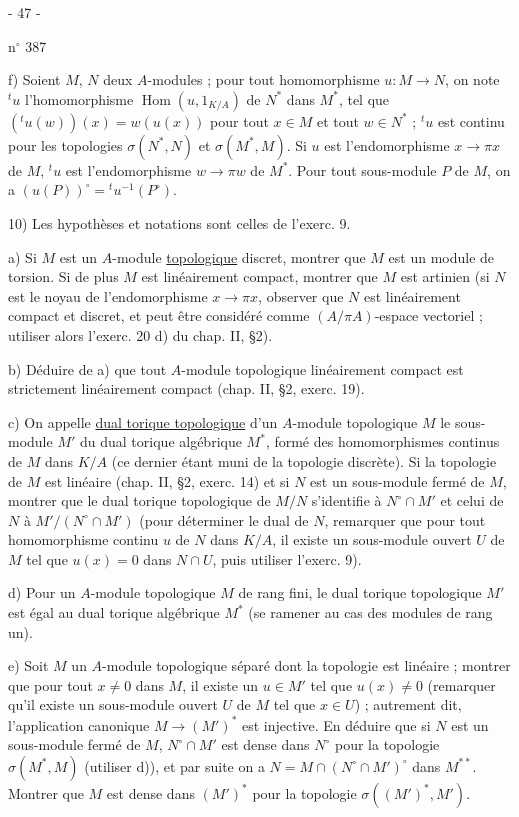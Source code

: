 \begin{center}- 47 -\end{center}
\hfill n$^\circ$ 387

f) Soient $M$, $N$ deux $A$-modules ; pour tout homomorphisme $u:M\longrightarrow N$, on note ${}^tu$ l'homomorphisme $\operatorname{Hom}(u,1_{K/A})$ de $N^*$ dans $M^*$, tel que $({}^tu(w))(x)=w(u(x))$ pour tout $x\in M$ et tout $w\in N^*$ ; ${}^tu$ est continu pour les topologies $\sigma(N^*,N)$ et $\sigma(M^*,M)$. Si $u$ est l'endomorphisme $x\longrightarrow\pi x$ de $M$, ${}^tu$ est l'endomorphisme $w\longrightarrow\pi w$ de $M^*$. Pour tout sous-module $P$ de $M$, on a $(u(P))^\circ={}^tu^{-1}(P^\circ)$.

10) Les hypothèses et notations sont celles de l'exerc. 9.

a) Si $M$ est un $A$-module \uline{topologique} discret, montrer que $M$ est un module de torsion. Si de plus $M$ est linéairement compact, montrer que $M$ est artinien (si $N$ est le noyau de l'endomorphisme $x\longrightarrow\pi x$, observer que $N$ est linéairement compact et discret, et peut être considéré comme $(A/\pi A)$-espace vectoriel ; utiliser alors l'exerc. 20 d) du chap. II, \S 2).

b) Déduire de a) que tout $A$-module topologique linéairement compact est strictement linéairement compact (chap. II, \S 2, exerc. 19).

c) On appelle \uline{dual torique topologique} d'un $A$-module topologique $M$ le sous-module $M'$ du dual torique algébrique $M^*$, formé des homomorphismes continus de $M$ dans $K/A$ (ce dernier étant muni de la topologie discrète). Si la topologie de $M$ est linéaire (chap. II, \S 2, exerc. 14) et si $N$ est un sous-module fermé de $M$, montrer que le dual torique topologique de $M/N$ s'identifie à $N^\circ\cap M'$ et celui de $N$ à $M'/(N^\circ\cap M')$ (pour déterminer le dual de $N$, remarquer que pour tout homomorphisme continu $u$ de $N$ dans $K/A$, il existe un sous-module ouvert $U$ de $M$ tel que $u(x)=0$ dans $N\cap U$, puis utiliser l'exerc. 9).

d) Pour un $A$-module topologique $M$ de rang fini, le dual torique topologique $M'$ est égal au dual torique algébrique $M^*$ (se ramener au cas des modules de rang un).

e) Soit $M$ un $A$-module topologique séparé dont la topologie est linéaire ; montrer que pour tout $x\ne0$ dans $M$, il existe un $u\in M'$ tel que $u(x)\ne0$ (remarquer qu'il existe un sous-module ouvert $U$ de $M$ tel que $x\in U$) ; autrement dit, l'application canonique $M\longrightarrow(M')^*$ est injective. En déduire que si $N$ est un sous-module fermé de $M$, $N^\circ\cap M'$ est dense dans $N^\circ$ pour la topologie $\sigma(M^*,M)$ (utiliser d)), et par suite on a $N=M\cap(N^\circ\cap M')^\circ$ dans $M^{**}$. Montrer que $M$ est dense dans $(M')^*$ pour la topologie $\sigma((M')^*,M')$.
